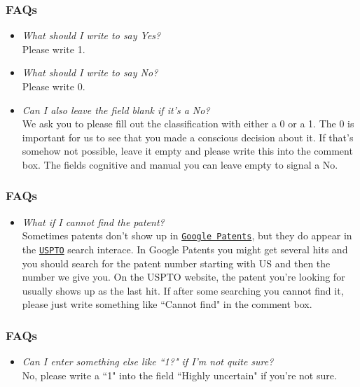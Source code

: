 \documentclass[10pt]{beamer}
\begin{document}
\begin{frame}\frametitle{FAQs}
	\begin{itemize}	
	\item \textit{What should I write to say Yes?}\\[0.1cm]
	Please write 1.
	\item \textit{What should I write to say No?}\\[0.1cm]
	Please write 0.
	\item \textit{Can I also leave the field blank if it's a No?}\\[0.1cm]
	We ask you to please fill out the classification with either a 0 or a 1. The 0 is important for us to see that you made a conscious decision about it. If that's somehow not possible, leave it empty and please write this into the comment box. The fields cognitive and manual you can leave empty to signal a No.
		\end{itemize}
\end{frame}


\begin{frame}\frametitle{FAQs}
	\begin{itemize}	
	\item \textit{What if I cannot find the patent?}\\[0.1cm]
Sometimes patents don't show up in \href{https://www.google.com/patents}{\texttt{Google Patents}}, but they do appear in the \href{http://patft.uspto.gov/netahtml/PTO/search-bool.html}{\texttt{USPTO}} search interace. In Google Patents you might get several hits and you should search for the patent number starting with US and then the number we give you. On the USPTO website, the patent you're looking for usually shows up as the last hit. If after some searching you cannot find it, please just write something like ``Cannot find" in the comment box.
	\end{itemize}
\end{frame}


\begin{frame}\frametitle{FAQs}
	\begin{itemize}	
	\item \textit{Can I enter something else like ``1?" if I'm not quite sure?}\\[0.1cm]
	No, please write a ``1" into the field ``Highly uncertain" if you're not sure.
	\end{itemize}
\end{frame}
\end{document}
